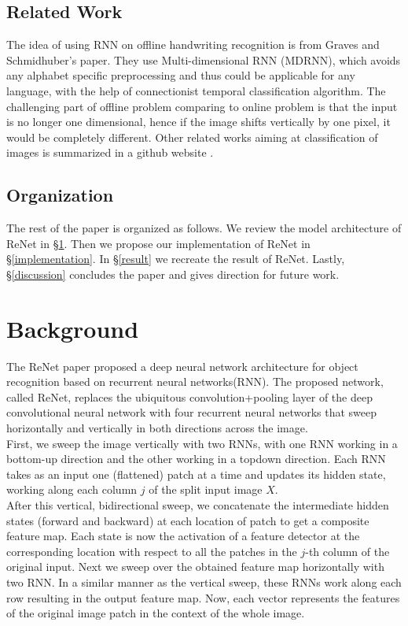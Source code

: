 \documentclass[final,leqno]{siamltex}
\begin{document}
\subsection{Related Work}
The idea of using RNN on offline handwriting recognition is from Graves and Schmidhuber's paper\cite{multidimrnn}. They use Multi-dimensional RNN (MDRNN), which avoids any alphabet specific preprocessing and thus could be applicable for any language, with the help of connectionist temporal classification algorithm. The challenging part of offline problem comparing to online problem is that the input is no longer one dimensional, hence if the image shifts vertically by one pixel, it would be completely different. 
Other related works aiming at classification of images is summarized in a github website \cite{imgcls}. 

\subsection{Organization}

The rest of the paper is organized as follows. We review the model architecture of ReNet in \S \ref{background}. Then we propose our implementation of ReNet in \S \ref{implementation}. In \S \ref{result} we recreate the result of ReNet. Lastly, \S \ref{discussion} concludes the paper and gives direction for future work.

\section{Background} \label{background} 
The ReNet paper proposed a deep neural network architecture for object recognition based on recurrent neural networks(RNN). The proposed network, called ReNet, replaces the ubiquitous convolution+pooling layer of the deep convolutional neural network with four recurrent neural networks that sweep horizontally and vertically in both directions across the image. \\

First, we sweep the image vertically with two RNNs, with one RNN working in a bottom-up direction and the other working in a topdown direction. Each RNN takes as an input one (flattened) patch at a time and updates its hidden state, working along each column $j$ of the split input image $X$.\\

After this vertical, bidirectional sweep, we concatenate the intermediate hidden states (forward and backward) at each location of patch to get a composite feature map. Each state is now the activation of a feature detector at the corresponding location with respect to all the patches in the $j$-th column of the original input. Next we sweep over the obtained feature map horizontally with two RNN. In a similar manner as the vertical sweep, these RNNs work along each row resulting in the output feature map. Now, each vector represents the features of the original image patch in the context of the whole image.\\
\end{document}
